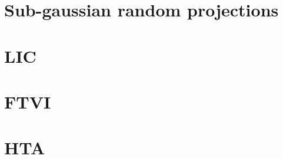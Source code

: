\documentclass[oldfontcommands]{ucbthesis}
\begin{document}
\chapter{Sub-gaussian random projections}



\chapter{LIC}


\chapter{FTVI}


\chapter{HTA}


\printbibliography

\end{document}
